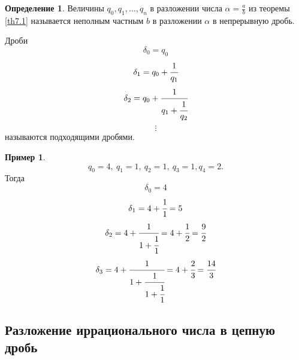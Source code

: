 \documentclass[a4paper, 12pt]{article}
\theoremstyle{definition}
\newtheorem{definition}{Определение}[section]
\newtheorem*{example}{Пример}
\begin{document}
    \begin{definition}
        Величины $q_0, q_1, \dots, q_n$ в разложении числа $\alpha=\frac{a}{b}$ из теоремы \ref{th7.1} называется неполным частным $b$ в разложении $\alpha$ в непрерывную дробь.
    \end{definition} 
        Дроби \[\delta_0=q_0\]
        \[\delta_1=q_0+\cfrac{1}{q_1}\] 
        \[\delta_2=q_0+\cfrac{1}{q_1+\cfrac{1}{q_2}}\]
        \[\vdots\]
    называются подходящими дробями.
    \begin{example}
    \[q_0=4,\ q_1=1,\ q_2=1,\ q_3=1, q_4=2.\]
    Тогда
    \[\delta_0=4\]
    \[\delta_1=4+\cfrac{1}{1}=5\]
    \[\delta_2=4+\cfrac{1}{1+\cfrac{1}{1}}=4+\cfrac{1}{2}=\cfrac{9}{2}\]
    \[\delta_3=4+\cfrac{1}{1+\cfrac{1}{1+\cfrac{1}{1}}}=4+\cfrac{2}{3}=\cfrac{14}{3}\]
    \end{example}
    \subsection*{Разложение иррационального числа в цепную дробь}
    
\end{document}
